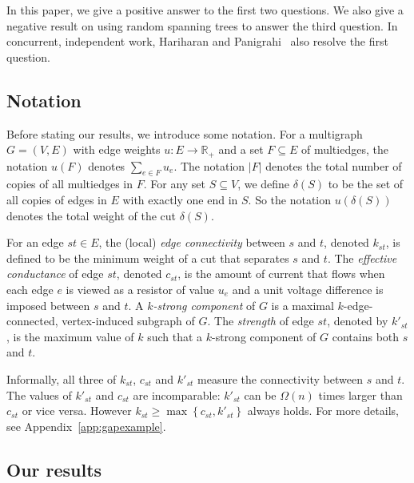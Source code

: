 \documentclass[11pt]{article}
\numberwithin{equation}{section}
\newcommand{\newterm}[1]{\textit{#1}}
\newcommand{\bR}{\mathbb{R}}
\newcommand{\set}[1]{\left \{ #1 \right \}}                     \newcommand{\setst}[2]{\left\{\; #1 \,:\, #2 \;\right\}}
\newcommand{\Appendix}[1]{Appendix~\ref{app:#1}}
\begin{document}
In this paper, we give a positive answer to the first two questions.
We also give a negative result on using random spanning trees to answer the third question.
In concurrent, independent work, Hariharan and Panigrahi~\cite{HP} also resolve
the first question.


\subsection{Notation}

Before stating our results, we introduce some notation.
For a multigraph $G=(V,E)$ with edge weights $u : E \rightarrow \bR_+$
and a set $F \subseteq E$ of multiedges,
the notation $u(F)$ denotes $\sum_{e \in F} u_e$.
The notation $|F|$ denotes the total number of copies of all multiedges in $F$.
For any set $S\subseteq V$, we define $\delta(S)$ to be
the set of all copies of edges in $E$ with exactly one end in $S$.
So the notation $u(\delta(S))$ denotes the total weight of the cut $\delta(S)$.


For an edge $st\in E$, the (local) \newterm{edge connectivity} between $s$ and $t$,
denoted $k_{st}$, is defined to be the minimum weight of a cut that separates $s$ and $t$.
The \newterm{effective conductance} of edge $st$, denoted $c_{st}$,
is the amount of current that flows when 
each edge $e$ is viewed as a resistor of value $u_e$
and a unit voltage difference is imposed between $s$ and $t$.
A \newterm{$k$-strong component} of $G$ is a maximal $k$-edge-connected,
vertex-induced subgraph of $G$.
The \newterm{strength} of edge $st$, denoted by $k'_{st}$, is
the maximum value of $k$ such that a $k$-strong component of $G$ contains both $s$ and $t$.

Informally, all three of $k_{st}$, $c_{st}$ and $k'_{st}$
measure the connectivity between $s$ and $t$.
The values of $k'_{st}$ and $c_{st}$ are incomparable:
$k'_{st}$ can be $\Omega(n)$ times larger than $c_{st}$ or vice versa.
However $k_{st} \geq \max \set{ c_{st}, k'_{st} }$ always holds.
For more details, see \Appendix{gapexample}.



\subsection{Our results}
\end{document}
